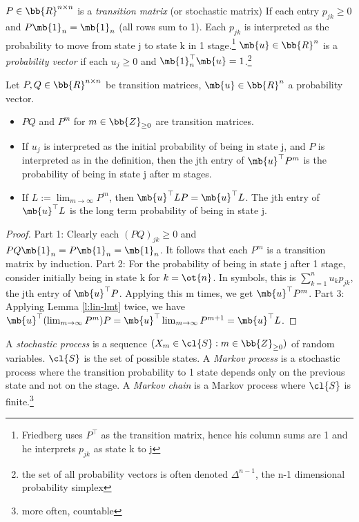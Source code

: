 \begin{defn}
$P \in \bb{R}^{n \times n}$ is a \emph{transition matrix} (or stochastic matrix) If each entry $p_{jk}\geq 0$ and $P \mb{1}_n= \mb{1}_n$ (all rows sum to 1).
Each $p_{jk}$ is interpreted as the probability to move from state j to state k in 1 stage.\footnote{Friedberg uses $P^\top$ as the transition matrix, hence his column sums are 1 and he interprets $p_{jk}$ as state k to j}
$\mb{u}\in \bb{R}^n$ is a \emph{probability vector} if each $u_j \geq 0$ and $\mb{1}_n^\top \mb{u}=1$.\footnote{the set of all probability vectors is often denoted $\Delta^{n-1}$, the n-1 dimensional probability simplex}
\end{defn}
\begin{lem}\label{l:tm-def}
Let $P,Q \in \bb{R}^{n \times n}$ be transition matrices, $\mb{u}\in \bb{R}^n$ a probability vector.
\begin{itemize}
\item $PQ$ and $P^m$ for $m \in \bb{Z}_{\geq 0}$ are transition matrices.
\item If $u_j$ is interpreted as the initial probability of being in state j, and $P$ is interpreted as in the definition, then the jth entry of $\mb{u}^\top P^m$ is the probability of being in state j after m stages.
\item If $L:= \lim_{m \to \infty}P^m$, then $\mb{u}^\top LP= \mb{u}^\top L$. The jth entry of $\mb{u}^\top L$ is the long term probability of being in state j.
\end{itemize}
\end{lem}
\begin{proof}%
Part 1: Clearly each $(PQ)_{jk}\geq 0$ and $PQ \mb{1}_n= P \mb{1}_n= \mb{1}_n$. It follows that each $P^m$ is a transition matrix by induction.
Part 2: For the probability of being in state j after 1 stage, consider initially being in state k for $k= \ot{n}$. In symbols, this is $\sum_{k=1}^nu_kp_{jk}$, the jth entry of $\mb{u}^\top P$. Applying this m times, we get $\mb{u}^\top P^m$.
Part 3: Applying Lemma \ref{l:lin-lmt} twice, we have $\mb{u}^\top( \lim_{m \to \infty}P^m)P= \mb{u}^\top \lim_{m \to \infty}P^{m+1}= \mb{u}^\top L$.
\end{proof}
\begin{defn}
A \emph{stochastic process} is a sequence $(X_m \in \cl{S}:m \in \bb{Z}_{\geq 0})$ of random variables. $\cl{S}$ is the set of possible states.
A \emph{Markov process} is a stochastic process where the transition probability to 1 state depends only on the previous state and not on the stage.
A \emph{Markov chain} is a Markov process where $\cl{S}$ is finite.\footnote{more often, countable}
\end{defn}
